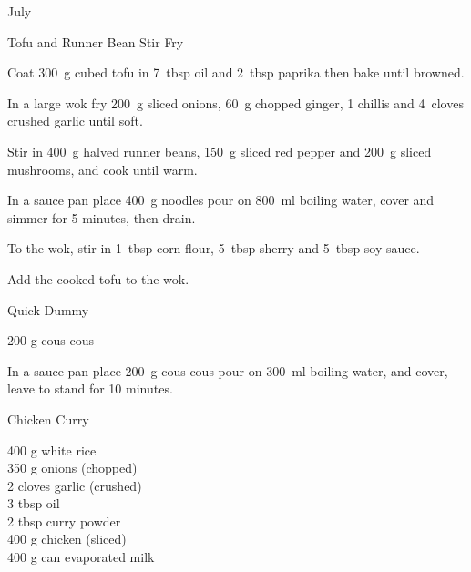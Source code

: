 \begin{menu}{July}
\begin{recipe}{2}{Tofu and Runner Bean Stir Fry}
    \begin{instructions}
    \item 
        Coat
        300~g cubed tofu
        in
        7~tbsp  oil
        and
        2~tbsp  paprika
        then bake until browned.
      \item 
        In a large wok fry 200~g sliced onions,
        60~g chopped ginger,
        1  chillis
        and
        4~cloves crushed garlic
        until soft.
      \item 
        Stir in
        400~g halved runner beans,
        150~g sliced red pepper
        and
        200~g sliced mushrooms,
        and cook until warm.
      \item 
    In a
    sauce pan
    place
    400~g  noodles
    pour on
    800~ml  boiling water,
    cover and simmer for 5 minutes, then drain.
  \item 
        To the wok, stir in
        1~tbsp  corn flour,
        5~tbsp  sherry
        and
        5~tbsp  soy sauce.
      \item 
        Add the cooked tofu to the wok.
      
    \end{instructions}
    \end{recipe}%
  
    \begin{recipe}{1}{Quick Dummy}%
		\begin{ingredients}
		200 g cous cous  \\
	
		\end{ingredients}
	
	
    \begin{instructions}
    \item 
    In a
    sauce pan 
    place
    200~g  cous cous
    pour on
    300~ml  boiling water,
    and cover, leave to stand for 10 minutes.
  
    \end{instructions}
    \end{recipe}%
  
    \begin{recipe}{2}{Chicken Curry}%
		\begin{ingredients}
		400 g white rice  \\
	350 g onions (chopped) \\
	2 cloves garlic (crushed) \\
	3 tbsp oil  \\
	2 tbsp curry powder  \\
	400 g chicken (sliced) \\
	400 g can evaporated milk  \\
	

\end{ingredients}
\end{recipe}
\end{menu}
